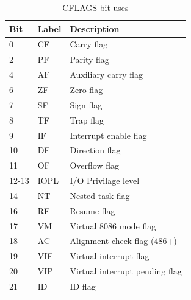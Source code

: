 \documentclass[a4paper,11pt]{report}
\begin{document}
\begin{itemize}
\begin{table}[htb]
\begin{tabular}{| l | l | l |}
								\hline
								\textbf{Bit} &  \textbf{Label} &   \textbf{Description} \\\hline 
								0   &   CF &     Carry flag \\ \hline
								2   &   PF   &   Parity flag \\ \hline
								4   &   AF   &   Auxiliary carry flag \\ \hline
								6   &   ZF   &   Zero flag \\ \hline
								7   &   SF   &   Sign flag \\ \hline
								8   &   TF   &   Trap flag \\ \hline
								9   &   IF   &   Interrupt enable flag \\ \hline
								10  &   DF   &   Direction flag \\ \hline
								11  &   OF   &   Overflow flag \\ \hline
								12-13 & IOPL &   I/O Privilage level \\ \hline
								14  &   NT   &   Nested task flag \\ \hline
								16  &   RF   &   Resume flag \\ \hline
								17  &   VM   &   Virtual 8086 mode flag \\ \hline
								18  &   AC   &   Alignment check flag (486+) \\ \hline
								19  &   VIF  &   Virtual interrupt flag \\ \hline
								20  &   VIP  &   Virtual interrupt pending flag \\ \hline
								21  &   ID   &   ID flag \\ \hline
						\end{tabular}
						\caption{CFLAGS bit uses}
						\label{tab:CFLAGSBits}
					\end{table}
				\end{itemize}
				
\end{document}
